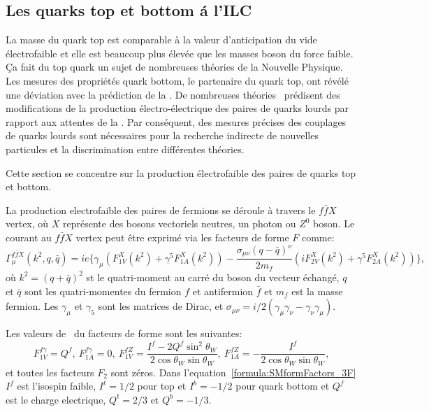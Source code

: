 \subsection*{Les quarks top et bottom \'a l'ILC}

La masse du quark top est comparable à la valeur d'anticipation du vide électrofaible et elle est beaucoup plus élevée que les masses boson du force faible.
\c Ca fait du top quark un sujet de nombreuses théories de la Nouvelle Physique.
Les mesures des propriétés quark bottom, le partenaire du quark top, ont révélé une déviation avec la prédiction de la \sm.
De nombreuses théories \bsm\ prédisent des modifications de la production électro-électrique des paires de quarks lourds par rapport aux attentes de la \sm.
Par conséquent, des mesures précises des couplages de quarks lourds sont nécessaires pour la recherche indirecte de nouvelles particules et la discrimination entre différentes théories.

Cette section se concentre sur la production électrofaible des paires de quarks top et bottom.

La production electrofaible des paires de fermions se déroule à travers le $f\bar{f}X$ vertex, où $X$ représente des bosons vectoriels neutres, un photon ou $Z^0$ boson. Le courant au $f\bar{f}X$ vertex peut être exprimé via les facteurs de forme $F$ comme:
\begin{equation}
\Gamma^{f\bar{f}X}_\mu (k^2,q,\bar{q}) = ie\{ \gamma_\mu (F^X_{1V}(k^2) + \gamma^5 F^X_{1A}(k^2)) - \frac{\sigma_{\mu\nu}(q-\bar{q})^\nu}{2m_f}(iF^X_{2V}(k^2) + \gamma^5 F^X_{2A}(k^2)) \},
\end{equation}
où $k^2= (q+\bar{q})^2$ st le quatri-moment au carré du boson du vecteur échangé, $q$ et $\bar{q} $ sont les quatri-momentes du fermion $f$ et antifermion $\bar{f}$ et $m_f$ est la masse fermion. Les $\gamma_\mu$ et $\gamma_5$ sont les matrices de Dirac, et $\sigma_{\mu\nu} = i/2(\gamma_\mu\gamma_\nu - \gamma_\nu\gamma_\mu)$.

Les valeurs de \sm\ du facteurs de forme sont les suivantes:
\begin{equation}
F^{f\gamma}_{1V} = Q^{f}, \ F^{f\gamma}_{1A} = 0, \ F^{fZ}_{1V} = \frac{I^f - 2Q^f\sin^2\theta_W}{2\cos\theta_W\sin\theta_W}, \ F^{fZ}_{1A} = - \frac{I^f}{2\cos\theta_W\sin\theta_W},
\label{formula:SMformFactors_3F}
\end{equation}
et toutes les facteurs $F_2$ sont zéros. Dans l'equation~\ref{formula:SMformFactors_3F} $I^f$ est  l'isospin faible, $I^t = 1/2$ pour top et $I^b = -1/2$ pour quark bottom  et $Q^f$ est le charge electrique, $Q^t = 2/3$ et $Q^b = -1/3$.

